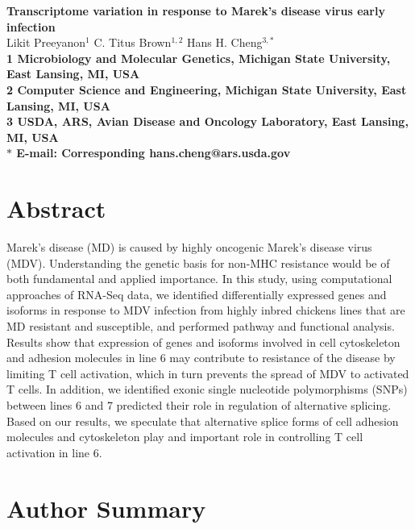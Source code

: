\documentclass[10pt]{article}
\date{}
\begin{document}
\begin{flushleft}
{\Large
\textbf{Transcriptome variation in response to Marek's disease virus early infection}
}
\\
Likit Preeyanon$^{1}$
C. Titus Brown$^{1,2}$
Hans H. Cheng$^{3,\ast}$
\\
\bf{1} Microbiology and Molecular Genetics, Michigan State University, East Lansing, MI, USA
\\
\bf{2} Computer Science and Engineering, Michigan State University, East Lansing, MI, USA
\\
\bf{3} USDA, ARS, Avian Disease and Oncology Laboratory, East Lansing, MI, USA
\\
$\ast$ E-mail: Corresponding hans.cheng@ars.usda.gov
\end{flushleft}

\section*{Abstract}
Marek's disease (MD) is caused by highly oncogenic Marek's disease virus (MDV).
Understanding the genetic basis for non-MHC resistance would be of both
fundamental and applied importance.  In this study, using computational
approaches of RNA-Seq data, we identified differentially expressed genes and
isoforms in response to MDV infection from highly inbred chickens lines that are
MD resistant and susceptible, and performed pathway and functional analysis.
Results show that expression of genes and isoforms involved in cell cytoskeleton
and adhesion molecules in line 6 may contribute to resistance of the disease by
limiting T cell activation, which in turn prevents the spread of MDV to
activated T cells.  In addition, we identified exonic single nucleotide
polymorphisms (SNPs) between lines 6 and 7 predicted their role in regulation of
alternative splicing.  Based on our results, we speculate that alternative
splice forms of cell adhesion molecules and cytoskeleton play and important role
in controlling T cell activation in line 6.

\section*{Author Summary}
\end{document}
